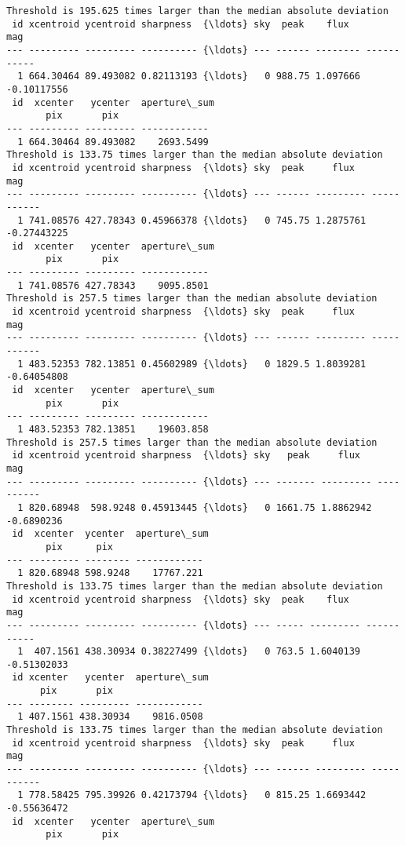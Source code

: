 \documentclass[11pt]{article}
\begin{document}
    \begin{Verbatim}[commandchars=\\\{\}]
Threshold is 195.625 times larger than the median absolute deviation
 id xcentroid ycentroid sharpness  {\ldots} sky  peak    flux       mag
--- --------- --------- ---------- {\ldots} --- ------ -------- -----------
  1 664.30464 89.493082 0.82113193 {\ldots}   0 988.75 1.097666 -0.10117556
 id  xcenter   ycenter  aperture\_sum
       pix       pix
--- --------- --------- ------------
  1 664.30464 89.493082    2693.5499
Threshold is 133.75 times larger than the median absolute deviation
 id xcentroid ycentroid sharpness  {\ldots} sky  peak     flux       mag
--- --------- --------- ---------- {\ldots} --- ------ --------- -----------
  1 741.08576 427.78343 0.45966378 {\ldots}   0 745.75 1.2875761 -0.27443225
 id  xcenter   ycenter  aperture\_sum
       pix       pix
--- --------- --------- ------------
  1 741.08576 427.78343    9095.8501
Threshold is 257.5 times larger than the median absolute deviation
 id xcentroid ycentroid sharpness  {\ldots} sky  peak     flux       mag
--- --------- --------- ---------- {\ldots} --- ------ --------- -----------
  1 483.52353 782.13851 0.45602989 {\ldots}   0 1829.5 1.8039281 -0.64054808
 id  xcenter   ycenter  aperture\_sum
       pix       pix
--- --------- --------- ------------
  1 483.52353 782.13851    19603.858
Threshold is 257.5 times larger than the median absolute deviation
 id xcentroid ycentroid sharpness  {\ldots} sky   peak     flux      mag
--- --------- --------- ---------- {\ldots} --- ------- --------- ----------
  1 820.68948  598.9248 0.45913445 {\ldots}   0 1661.75 1.8862942 -0.6890236
 id  xcenter  ycenter  aperture\_sum
       pix      pix
--- --------- -------- ------------
  1 820.68948 598.9248    17767.221
Threshold is 133.75 times larger than the median absolute deviation
 id xcentroid ycentroid sharpness  {\ldots} sky  peak    flux       mag
--- --------- --------- ---------- {\ldots} --- ----- --------- -----------
  1  407.1561 438.30934 0.38227499 {\ldots}   0 763.5 1.6040139 -0.51302033
 id xcenter   ycenter  aperture\_sum
      pix       pix
--- -------- --------- ------------
  1 407.1561 438.30934    9816.0508
Threshold is 133.75 times larger than the median absolute deviation
 id xcentroid ycentroid sharpness  {\ldots} sky  peak     flux       mag
--- --------- --------- ---------- {\ldots} --- ------ --------- -----------
  1 778.58425 795.39926 0.42173794 {\ldots}   0 815.25 1.6693442 -0.55636472
 id  xcenter   ycenter  aperture\_sum
       pix       pix

\end{Verbatim}
\end{document}
